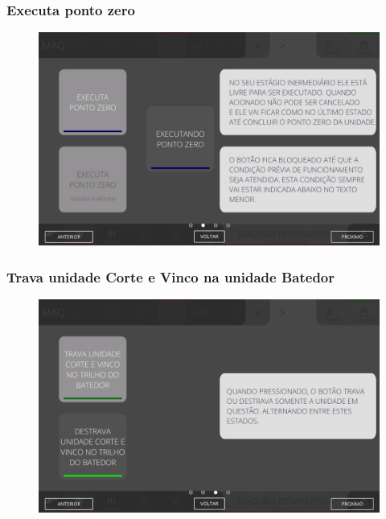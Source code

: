\newpage
\thispagestyle{fancy}
\vspace*{40 pt}
\subsubsection{\small{Executa ponto zero}} \label{sec:comandosCorteVincoExecutaPontoZero}
\vspace*{\fill}
\begin{figure}[h]
    \centering
    \includegraphics[width=576 px,height=360 px]{src/imagesICV/06-dryCutter/commands/e-2.png}
\end{figure}
\vspace*{\fill}

\newpage
\thispagestyle{fancy}
\vspace*{40 pt}
\subsubsection{\small{Trava unidade Corte e Vinco na unidade Batedor}} \label{sec:comandosCorteVincoTravaUnidadeCorteVincoUnidadeBatedor}
\vspace*{\fill}
\begin{figure}[h]
    \centering
    \includegraphics[width=576 px,height=360 px]{src/imagesICV/06-dryCutter/commands/e-3.png}
\end{figure}
\vspace*{\fill}

